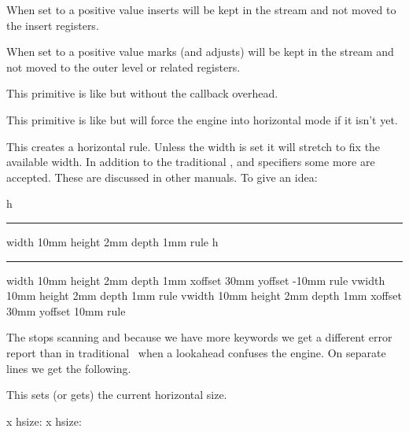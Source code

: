\stopnewprimitive

\startoldprimitive[title={\prm {holdinginserts}}]

When set to a positive value inserts will be kept in the stream and not moved to
the insert registers.

\stopoldprimitive

\startnewprimitive[title={\prm {holdingmigrations}}]

When set to a positive value marks (and adjusts) will be kept in the stream and
not moved to the outer level or related registers.

\stopnewprimitive

\startnewprimitive[title={\prm {hpack}}]

This primitive is like  but without the callback overhead.

\stopnewprimitive

\startnewprimitive[title={\prm {hpenalty}}]

This primitive is like  but will force the engine into horizontal
mode if it isn't yet.

\stopnewprimitive

\startoldprimitive[title={\prm {hrule}}]

This creates a horizontal rule. Unless the width is set it will stretch to fix
the available width. In addition to the traditional , 
and  specifiers some more are accepted. These are discussed in other
manuals. To give an idea:

\startbuffer
h\hrule width 10mm height 2mm depth 1mm \relax rule
h\hrule width 10mm height 2mm depth 1mm xoffset 30mm yoffset -10mm \relax rule
v\vrule width 10mm height 2mm depth 1mm \relax rule
v\vrule width 10mm height 2mm depth 1mm xoffset 30mm yoffset  10mm \relax rule
\stopbuffer

\typebuffer

The  stops scanning and because we have more keywords we get a
different error report than in traditional \TEX\ when a lookahead confuses the
engine. On separate lines we get the following.

\startlines
\getbuffer
\stoplines

\stopoldprimitive

\startoldprimitive[title={\prm {hsize}}]

This sets (or gets) the current horizontal size.

\startbuffer
\hsize 40pt \vbox{x} hsize: \the{}
\vbox{\hsize 40pt x} hsize: \the{}
\stopbuffer

